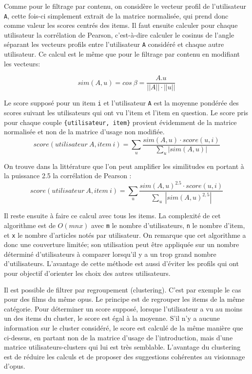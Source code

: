 \documentclass{article}
\begin{document}
Comme pour le filtrage par contenu, on considère le vecteur profil de l'utilisateur \verb'A', cette fois-ci simplement extrait de la matrice normalisée, qui prend donc comme valeur les scores centrés des items. Il faut ensuite calculer pour chaque utilisateur la corrélation de Pearson, c'est-à-dire calculer le cosinus de l'angle séparant les vecteurs profils entre l'utilisateur \verb'A' considéré et chaque autre utilisateur. Ce calcul est le même que pour le filtrage par contenu en modifiant les vecteurs: 

\[sim(A,u)=cos~\beta = \frac{A.u}{||A||\cdot||u||}\]

Le score supposé pour un item \verb'i' et l'utilisateur \verb'A' est la moyenne pondérée des scores suivant les utilisateurs qui ont vu l'item et l'item en question. Le score pris pour chaque couple \verb'{utilisateur, item}' provient évidemment de la matrice normalisée et non de la matrice d'usage non modifiée.
\[score(utilisateur~A, item~i) = \sum_{u} \frac{sim(A,u)\cdot score(u,i)}{\sum_{u} |sim(A,u)|}\]

On trouve dans la littérature que l'on peut amplifier les similitudes en portant à la puissance 2.5 la corrélation de Pearson : \[score(utilisateur~A, item~i) = \sum_{u} \frac{sim(A,u)^{2.5}\cdot score(u,i)}{\sum_{u} ~|sim(A,u)^{2,5}|}\]

Il reste ensuite à faire ce calcul avec tous les items. La complexité de cet algorithme est de $O(mnx)$ avec \verb'm' le nombre d'utilisateurs, \verb'n' le nombre d'item, et \verb'x' le nombre d'articles notés par utilisateur. On remarque que cet algorithme a donc une couverture limitée; son utilisation peut être appliquée sur un nombre déterminé d'utilisateurs à comparer lorsqu'il y a un trop grand nombre d'utilisateurs.
L'avantage de cette méthode est aussi d'éviter les profils qui ont pour objectif d'orienter les choix des autres utilisateurs.
\newline

Il est possible de filtrer par regroupement (clustering). C'est par exemple le cas pour des films du même opus. Le principe est de regrouper les items de la même catégorie. Pour déterminer un score supposé, lorsque l'utilisateur a vu au moins un des items du cluster, le score est égal à la moyenne. S'il n'y a aucune information sur le cluster considéré, le score est calculé de la même manière que ci-dessus, en partant non de la matrice d'usage de l'introduction, mais d'une matrice utilisateurs-clusters qui lui est très semblable.
L'avantage du clustering est de réduire les calculs et de proposer des suggestions cohérentes au visionnage d'opus. 
\end{document}
